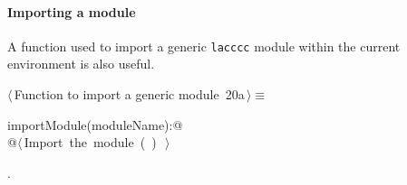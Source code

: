 \documentclass[11pt,oneside]{article}	%
\begin{document}
\paragraph{Importing a module} A function used to import a generic \texttt{lacccc} module within the current environment is also useful.
\begin{flushleft} \small
\begin{minipage}{\linewidth} \label{scrap35}
\protect{}$\langle\,$Function to import a generic module\nobreak\ {\footnotesize 20a}$\,\rangle\equiv$
\vspace{-1ex}
\begin{list}{}{} \item
\mbox{}\verb@def importModule(moduleName):@\\
\mbox{}\verb@   @\hbox{$\langle\,$Import the module\nobreak\ ({\footnotesize {}\label{scrap36}
 }\mbox{}\verb@moduleName@ ) {\footnotesize {}}$\,\rangle$}\verb@@\\
\mbox{}\verb@@{\NWsep}
\end{list}
\vspace{-1ex}
\footnotesize\addtolength{\baselineskip}{-1ex}
\begin{list}{}{\setlength{\itemsep}{-\parsep}\setlength{\itemindent}{-\leftmargin}}
\item {\NWtxtMacroNoRef}.
\end{list}
\end{minipage}\\[4ex]
\end{flushleft}






\end{document}
